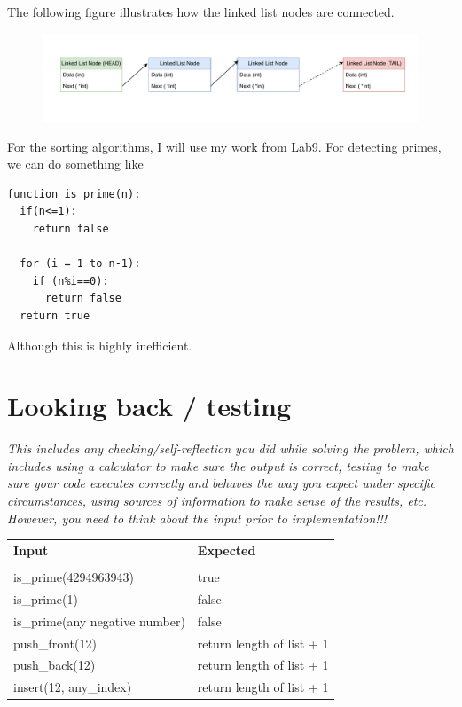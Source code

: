 \documentclass[a4paper, 11pt]{article}
\begin{document}
\noindent The following figure illustrates how the linked list nodes are
connected.
\begin{figure}[!hbt]
  \centering
  \includegraphics[width=1.0\columnwidth]{hw5_design.pdf}
\end{figure}

For the sorting algorithms, I will use my work from Lab9. For detecting primes,
we can do something like
\begin{lstlisting}
function is_prime(n):
  if(n<=1):
    return false

  for (i = 1 to n-1):
    if (n%i==0):
      return false
  return true
\end{lstlisting}
Although this is highly inefficient. 

\section*{Looking back / testing}

\textit{This includes any checking/self-reflection you did while solving the
  problem, which includes using a calculator to make sure the output is correct,
  testing to make sure your code executes correctly and behaves the way you
  expect under specific circumstances, using sources of information to make
  sense of the results, etc. However, you need to think about the input prior to
  implementation!!!}\\
\vspace{5em}

\begin{center}
 \begin{tabular}{l|l} %
   \textbf{Input} & \textbf{Expected} \\
    &    \\
   \hline
   is\_prime(4294963943) & true \\
   is\_prime(1) & false \\
   is\_prime(any negative number) & false \\
   push\_front(12) & return length of list + 1 \\
   push\_back(12) & return length of list + 1 \\
   insert(12, any\_index) & return length of list + 1 \\
 \end{tabular}
\end{center}
\end{document}
